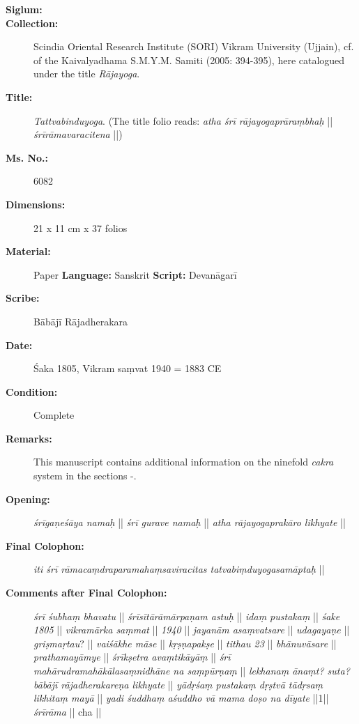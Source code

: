 \begin{description}
\item[\textbf{Siglum:}] \Huge{} \nocite{ytbu2}
\item[\textbf{Collection:}] Scindia Oriental Research Institute (SORI) Vikram University (Ujjain), cf.  of the Kaivalyadhama S.M.Y.M. Samiti (2005: 394-395), here catalogued under the title \emph{Rājayoga}. 
\item[\textbf{Title:}] \emph{Tattvabinduyoga}. (The title folio reads: \textit{atha śrī rājayogaprāraṃbhaḥ} || \textit{śrīrāmavaracitena} ||)
\item[\textbf{Ms. No.:}] 6082
\item[\textbf{Dimensions:}] 21 x 11 cm x 37 folios   
\item[\textbf{Material:}] Paper \hspace{0.5cm}  \textbf{Language:} Sanskrit \hspace{0.5cm} \textbf{Script:} Devanāgarī
\item[\textbf{Scribe:}] Bābājī Rājadherakara   
\item[\textbf{Date:}] Śaka 1805, Vikram saṃvat 1940 = 1883 CE
\item[\textbf{Condition:}] Complete
\item[\textbf{Remarks:}] This manuscript contains additional information on the ninefold \textit{cakra} system in the sections -.       
\item[\textbf{Opening:}] \textit{śrīgaṇeśāya namaḥ} || \textit{śrī gurave namaḥ} || \textit{atha rājayogaprakāro likhyate} ||
\item[\textbf{Final Colophon:}] \textit{iti śrī rāmacaṃdraparamahaṃsaviracitas tatvabiṃduyogasamāptaḥ} ||
\item[\textbf{Comments after Final Colophon:}]  \textit{śrī śubhaṃ bhavatu} ||  \textit{śrīsītārāmārpaṇam astuḥ} ||  \textit{idaṃ pustakaṃ} ||  \textit{śake 1805} ||  \textit{vikramārka saṃmat} ||  \textit{1940} || \textit{jayanām asaṃvatsare} ||  \textit{udagayaṇe} ||  \textit{griṣmaṛtau}? ||  \textit{vaiśākhe māse} ||  \textit{kṛṣṇapakṣe} ||  \textit{tithau 23} ||  \textit{bhānuvāsare} ||  \textit{prathamayāmye} ||  \textit{śrīkṣetra avaṃtikāyāṃ} ||  \textit{śrī mahārudramahākālasaṃnidhāne na saṃpūrṇaṃ} ||  \textit{lekhanaṃ ānaṃt? suta? bābājī rājadherakareṇa likhyate} ||  \textit{yādṛśaṃ pustakaṃ dṛṣtvā tādṛsaṃ likhitaṃ mayā} ||  \textit{yadi śuddhaṃ aśuddho vā mama doṣo na dīyate} ||1|| \textit{śrīrāma} || cha ||
\end{description}
